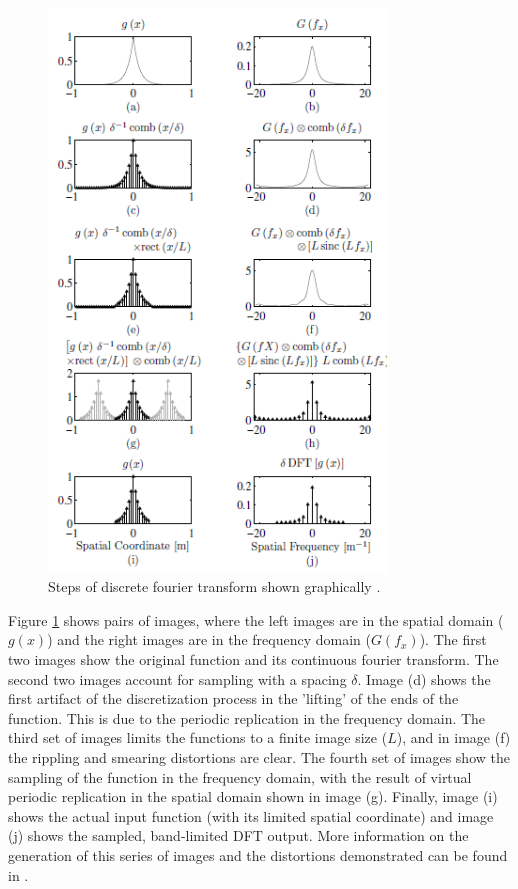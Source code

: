 \begin{figure}[H]
	\centering
		\includegraphics[width=0.8\textwidth]{figures/DFTGraphically.PNG}
	\caption{Steps of discrete fourier transform shown graphically \cite{NSOWP}.}
	\label{fig:DFTGraphs}
\end{figure}

Figure \ref{fig:DFTGraphs} shows pairs of images, where the left images are in the spatial domain ($g(x)$) and the right images are in the frequency domain ($G(f_x)$).  The first two images show the original function and its continuous fourier transform.  The second two images account for sampling with a spacing $\delta$.  Image (d) shows the first artifact of the discretization process in the 'lifting' of the ends of the function.  This is due to the periodic replication in the frequency domain.  The third set of images limits the functions to a finite image size ($L$), and in image (f) the rippling and smearing distortions are clear.  The fourth set of images show the sampling of the function in the frequency domain, with the result of virtual periodic  replication in the spatial domain shown in image (g).  Finally, image (i) shows the actual input function (with its limited spatial coordinate) and image (j) shows the sampled, band-limited DFT output. More information on the generation of this series of images and the distortions demonstrated can be found in \cite{NSOWP}. 

